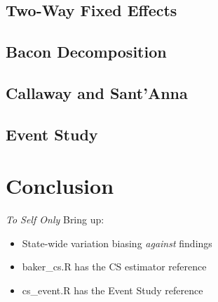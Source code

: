 \documentclass{article}
\begin{document}
\subsection{Two-Way Fixed Effects}

\subsection{Bacon Decomposition}

\subsection{Callaway and Sant'Anna}



\subsection{Event Study}

\section{Conclusion}

\emph{To Self Only}
Bring up:
\begin{itemize}
    \item State-wide variation biasing \emph{against} findings
\end{itemize}  

\begin{itemize}

    \item baker\_cs.R has the CS estimator reference
    \item cs\_event.R has the Event Study reference
\end{itemize}




\end{document}
